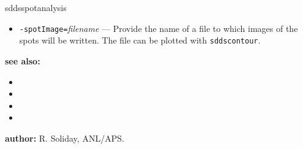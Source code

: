 \begin{sddsprog}{sddsspotanalysis}
\begin{itemize}
      \item \verb|-spotImage=|{\em filename} --- Provide the name of a file to which images of the spots will be written. The file can be plotted with \verb|sddscontour|.
    \end{itemize}
  \item \textbf{see also:}
    \begin{itemize}
      \item {}
      \item {}
      \item {}
      \item {}
    \end{itemize}
  \item \textbf{author:} R. Soliday, ANL/APS.
\end{sddsprog}

